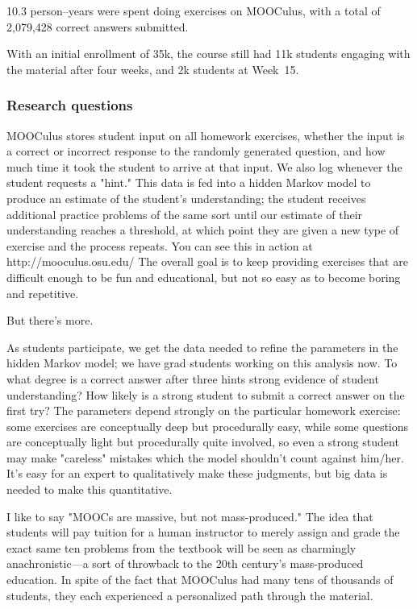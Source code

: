 \documentclass[12pt]{article}
\begin{document}
10.3 person--years were spent doing exercises on MOOCulus, with a
total of 2,079,428 correct answers submitted.  

With an initial enrollment of 35k, the course still had 11k students
engaging with the material after four weeks, and 2k students at
Week~15.

\subsubsection*{Research questions}

MOOCulus stores student input on all homework exercises, whether the
input is a correct or incorrect response to the randomly generated
question, and how much time it took the student to arrive at that
input.  We also log whenever the student requests a "hint."  This data
is fed into a hidden Markov model to produce an estimate of the
student's understanding; the student receives additional practice
problems of the same sort until our estimate of their understanding
reaches a threshold, at which point they are given a new type of
exercise and the process repeats.  You can see this in action at
http://mooculus.osu.edu/ The overall goal is to keep providing
exercises that are difficult enough to be fun and educational, but not
so easy as to become boring and repetitive.

But there's more.

As students participate, we get the data needed to refine the
parameters in the hidden Markov model; we have grad students working
on this analysis now.  To what degree is a correct answer after three
hints strong evidence of student understanding?  How likely is a
strong student to submit a correct answer on the first try?  The
parameters depend strongly on the particular homework exercise: some
exercises are conceptually deep but procedurally easy, while some
questions are conceptually light but procedurally quite involved, so
even a strong student may make "careless" mistakes which the model
shouldn't count against him/her.  It's easy for an expert to
qualitatively make these judgments, but big data is needed to make
this quantitative.

I like to say "MOOCs are massive, but not mass-produced."  The idea
that students will pay tuition for a human instructor to merely assign
and grade the exact same ten problems from the textbook will be seen
as charmingly anachronistic---a sort of throwback to the 20th
century's mass-produced education.  In spite of the fact that MOOCulus
had many tens of thousands of students, they each experienced a
personalized path through the material.
\end{document}

